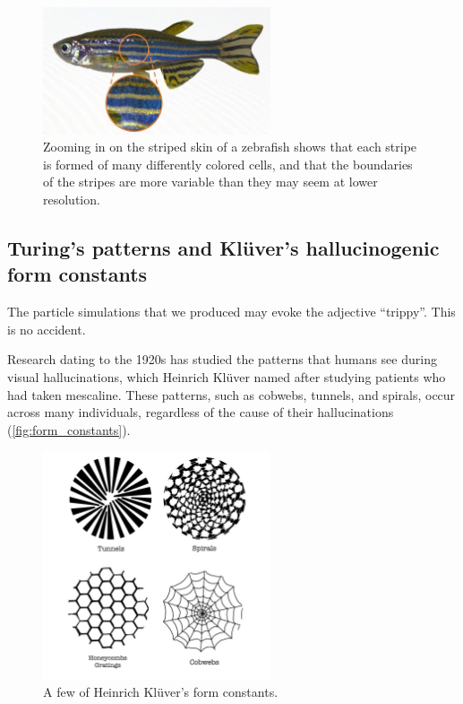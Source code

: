\begin{figure}[h]
\centering
\mySfFamily
\includegraphics[width = 0.6\textwidth]{../images/zebrafish_zoom}
\caption{Zooming in on the striped skin of a zebrafish shows that each stripe is formed of many differently colored cells, and that the boundaries of the stripes are more variable than they may seem at lower resolution.}
\label{fig:zebrafish_zoom}
\end{figure}

\FloatBarrier
{}
\subsection{Turing's patterns and Klüver's hallucinogenic form constants}

The particle simulations that we produced may evoke the adjective ``trippy''. This is no accident.

Research dating to the 1920s has studied the patterns that humans see during visual hallucinations, which Heinrich Klüver named  after studying patients who had taken mescaline. These patterns, such as cobwebs, tunnels, and spirals, occur across many individuals, regardless of the cause of their hallucinations (\autoref{fig:form_constants}).\\

\begin{figure}[h]
\centering
\mySfFamily
\includegraphics[width = 0.6\textwidth]{../images/form_constants}
\caption{A few of Heinrich Klüver's form constants.}
\label{fig:form_constants}
\end{figure}

